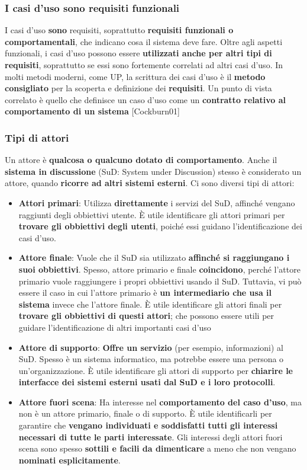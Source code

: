 \documentclass[12pt]{article}
\begin{document}
\subsubsection{I casi d'uso sono requisiti funzionali}
I casi d'uso \textbf{sono} requisiti, soprattutto \textbf{requisiti funzionali o comportamentali}, che indicano cosa il sistema deve fare.
Oltre agli aspetti funzionali, i casi d'uso possono essere \textbf{utilizzati anche per altri tipi di requisiti}, soprattutto se essi sono fortemente correlati ad altri casi d'uso.
In molti metodi moderni, come UP, la scrittura dei casi d'uso è il \textbf{metodo consigliato} per la scoperta e definizione dei \textbf{requisiti}.
Un punto di vista correlato è quello che definisce un caso d'uso come un \textbf{contratto relativo al comportamento di un sistema} [Cockburn01]
\subsubsection{Tipi di attori}
Un attore è \textbf{qualcosa o qualcuno dotato di comportamento}. Anche il \textbf{sistema in discussione} (SuD: System under Discussion) stesso è considerato un attore, quando \textbf{ricorre ad altri sistemi esterni}.
Ci sono diversi tipi di attori:
\begin{itemize}
    \item \textbf{Attori primari}: Utilizza \textbf{direttamente} i servizi del SuD, affinché vengano raggiunti degli obbiettivi utente. È utile identificare gli attori primari per \textbf{trovare gli obbiettivi degli utenti}, poiché essi guidano l'identificazione dei casi d'uso.
    \item \textbf{Attore finale}: Vuole che il SuD sia utilizzato \textbf{affinché si raggiungano i suoi obbiettivi}. Spesso, attore primario e finale \textbf{coincidono}, perché l'attore primario vuole raggiungere i propri obbiettivi usando il SuD. Tuttavia, vi può essere il caso in cui l'attore primario è \textbf{un intermediario che usa il sistema} invece che l'attore finale. È utile identificare gli attori finali per \textbf{trovare gli obbiettivi di questi attori}; che possono essere utili per guidare l'identificazione di altri importanti casi d'uso
    \item \textbf{Attore di supporto}: \textbf{Offre un servizio} (per esempio, informazioni) al SuD. Spesso è un sistema informatico, ma potrebbe essere una persona o un'organizzazione. È utile identificare gli attori di supporto per \textbf{chiarire le interfacce dei sistemi esterni usati dal SuD e i loro protocolli}.
    \item \textbf{Attore fuori scena}: Ha interesse nel \textbf{comportamento del caso d'uso}, ma non è un attore primario, finale o di supporto. È utile identificarli per garantire che \textbf{vengano individuati e soddisfatti tutti gli interessi necessari di tutte le parti interessate}. Gli interessi degli attori fuori scena sono spesso \textbf{sottili e facili da dimenticare} a meno che non vengano \textbf{nominati esplicitamente}.
\end{itemize}
\newpage
\end{document}
